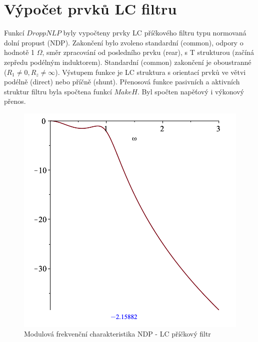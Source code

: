 \documentclass[twoside]{article}
\begin{document}
\section{Výpočet prvků LC filtru}
\noindent Funkcí $DroppNLP$ byly vypočteny prvky LC příčkového filtru typu normovaná dolní propust (NDP). Zakončení bylo zvoleno standardní (common), odpory o hodnotě 1 $\Omega$, směr zpracování od posledního prvku (rear), s T strukturou (začíná zepředu podélným induktorem). Standardní (common) zakončení je oboustranné ($R_1 \neq 0, R_z \neq \infty$). Výstupem funkce je LC struktura s orientací prvků ve větvi podélně (direct) nebo příčně (shunt).
\noindent Přenosová funkce pasivních a aktivních struktur filtru byla spočtena funkcí $MakeH$. Byl spočten  napěťový i výkonový přenos.
\begin{figure}[H]
\centering
\includegraphics[scale=0.5]{sch022.png}
\caption{Modulová frekvenční charakteristika NDP - LC příčkový filtr}
\end{figure}
\end{document}
